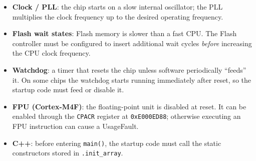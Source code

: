 \documentclass[a4paper,11pt]{article}
\begin{document}
\begin{itemize}
	\item \textbf{Clock / PLL}: the chip starts on a slow internal
	      oscillator; the PLL multiplies the clock frequency up to the desired
	      operating frequency.

	\item \textbf{Flash wait states}: Flash memory is slower than a fast
	      CPU. The Flash controller must be configured to insert additional
	      wait cycles \emph{before} increasing the CPU clock frequency.

	\item \textbf{Watchdog}: a timer that resets the chip unless software
	      periodically ``feeds'' it. On some chips the watchdog starts running
	      immediately after reset, so the startup code must feed or disable it.

	\item \textbf{FPU (Cortex-M4F)}: the floating-point unit is disabled
	      at reset. It can be enabled through the \texttt{CPACR} register at
	      \texttt{0xE000ED88}; otherwise executing an FPU instruction can cause
	      a UsageFault.

	\item \textbf{C++}: before entering \texttt{main()}, the startup code
	      must call the static constructors stored in \texttt{.init\_array}.
\end{itemize}
\end{document}
